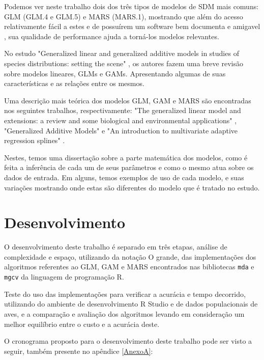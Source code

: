 \documentclass[
    12pt,               %
    openright,          %
    oneside,            %
    a4paper,            %
    english,            %
    brazil              %
    ]{abntex2}
\begin{document}
Podemos ver neste trabalho dois dos três tipos de modelos de SDM mais comuns: GLM (GLM.4 e GLM.5) e MARS (MARS.1), mostrando que
além do acesso relativamente fácil a estes e de possuírem um software bem documenta e amigavel \cite{predPerform33models}, sua 
qualidade de performance ajuda a torná-los modelos relevantes.

No estudo "Generalized linear and generalized additive models in studies of species distributions: setting the scene" 
\cite{GAMeGLM_especie_estudo}, os autores fazem uma breve revisão sobre modelos lineares, GLMs e GAMs. Apresentando algumas
de suas características e as relações entre os mesmos.

Uma descrição mais teórica dos modelos GLM, GAM e MARS são encontradas nos seguintes trabalhos, respectivamente: "The generalized 
linear model and extensions: a review and some biological and environmental applications" \cite{GLM}, "Generalized Additive Models"
\cite{GAM} e "An introduction to multivariate adaptive regression splines" \cite{MARS}.

Nestes, temos uma dissertação sobre a parte matemática dos modelos, como é feita a inferência de cada um de seus parâmetros e 
como o mesmo atua sobre os dados de entrada. Em alguns, temos exemplos de uso de cada modelo, e suas variações mostrando onde estas 
são diferentes do modelo que é tratado no estudo.

\chapter{Desenvolvimento}

O desenvolvimento deste trabalho é separado em três etapas, análise de complexidade e espaço, utilizando da notação O grande, 
das implementações dos algoritmos referentes ao GLM, GAM e MARS encontrados nas bibliotecas \lstinline|mda| e \lstinline|mgcv| da linguagem de programação R.

Teste do uso das implementações para verificar a acurácia e tempo decorrido, utilizando do ambiente de desenvolvimento R Studio e de dados populacionais de aves, 
e a comparação e avaliação dos algoritmos levando em consideração um melhor equilíbrio entre o custo e a acurácia deste.

O cronograma proposto para o desenvolvimento deste trabalho pode ser visto a seguir, também presente no apêndice \ref{AnexoA}:
\end{document}
